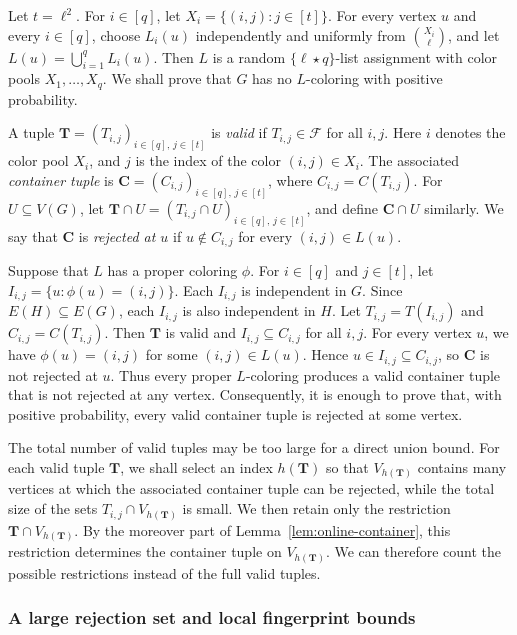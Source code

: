 \documentclass[12pt]{article}
\numberwithin{equation}{section}
\theoremstyle{definition}
\newcommand{\equalparts}[2]{\{#1\star #2\}}
\begin{document}
Let $t = \ell^2$. For $i \in [q]$, let
$X_i = \{(i,j) : j \in [t]\}$. For every vertex $u$ and every
$i \in [q]$, choose $L_i(u)$ independently and uniformly from
$\binom{X_i}{\ell}$, and let $L(u)=\bigcup_{i=1}^qL_i(u)$.
Then $L$ is a random $\equalparts{\ell}{q}$-list assignment with color pools
$X_1,\ldots,X_q$. We shall prove that $G$ has no $L$-coloring with positive
probability.

A tuple $\mathbf{T} = (T_{i,j})_{i \in [q],\,j \in [t]}$ is \emph{valid} if
$T_{i,j} \in \mathcal{F}$ for all $i,j$. Here $i$ denotes the color pool
$X_i$,
and $j$ is the index of the color $(i,j) \in X_i$. The associated
\emph{container tuple} is
$\mathbf{C} = (C_{i,j})_{i \in [q],\,j \in [t]}$, where
$C_{i,j} = C(T_{i,j})$. For $U\subseteq V(G)$, let
$\mathbf T\cap U=(T_{i,j}\cap U)_{i\in[q],\,j\in[t]}$, and define
$\mathbf C\cap U$ similarly. We say that $\mathbf{C}$ is \emph{rejected at $u$} if
$u \notin C_{i,j}$ for every $(i,j)\in L(u)$.

Suppose that $L$ has a proper coloring $\phi$. For $i \in [q]$ and
$j \in [t]$, let $I_{i,j} = \{u : \phi(u) = (i,j)\}$. Each $I_{i,j}$ is
independent in $G$. Since
$E(H) \subseteq E(G)$, each $I_{i,j}$ is also independent in $H$. Let
$T_{i,j} = T(I_{i,j})$ and $C_{i,j} = C(T_{i,j})$. Then $\mathbf{T}$ is valid and
$I_{i,j} \subseteq C_{i,j}$ for all $i,j$. For every vertex $u$, we have
$\phi(u) = (i,j)$ for some $(i,j)\in L(u)$. Hence
$u \in I_{i,j} \subseteq C_{i,j}$, so $\mathbf{C}$ is not rejected at $u$.
Thus every proper $L$-coloring produces a valid container tuple that is not
rejected at any vertex. Consequently, it is enough to prove that, with
positive probability, every valid container tuple is rejected at some
vertex.

The total number of valid tuples may be too large for a direct union bound.
For each valid tuple $\mathbf{T}$, we shall select an index $h(\mathbf T)$ so
that $V_{h(\mathbf T)}$ contains many vertices at which the associated
container tuple can be rejected, while the total size of the sets
$T_{i,j}\cap V_{h(\mathbf T)}$ is small. We then retain only the restriction
$\mathbf{T}\cap V_{h(\mathbf T)}$. By the moreover part of
Lemma~\ref{lem:online-container}, this restriction determines the container
tuple on $V_{h(\mathbf T)}$. We can therefore count the possible restrictions
instead of the full valid tuples.

\subsubsection{A large rejection set and local fingerprint bounds}
\end{document}
